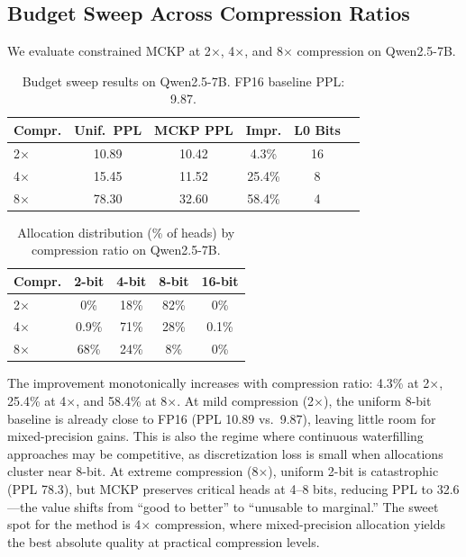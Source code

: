 \documentclass[11pt,a4paper]{article}
\begin{document}
\subsection{Budget Sweep Across Compression Ratios}
\label{sec:budget}

We evaluate constrained MCKP at 2$\times$, 4$\times$, and 8$\times$ compression on Qwen2.5-7B.

\begin{table}[t]
\centering
\small
\caption{Budget sweep results on Qwen2.5-7B. FP16 baseline PPL: 9.87.}
\label{tab:budget}
\begin{tabular}{lccccl}
\toprule
\textbf{Compr.} & \textbf{Unif.\ PPL} & \textbf{MCKP PPL} & \textbf{Impr.} & \textbf{L0 Bits} \\
\midrule
2$\times$ & 10.89 & 10.42 &  4.3\% & 16 \\
4$\times$ & 15.45 & 11.52 & 25.4\% &  8 \\
8$\times$ & 78.30 & 32.60 & 58.4\% &  4 \\
\bottomrule
\end{tabular}
\end{table}

\begin{table}[t]
\centering
\small
\caption{Allocation distribution (\% of heads) by compression ratio on Qwen2.5-7B.}
\label{tab:alloc_dist}
\begin{tabular}{lcccc}
\toprule
\textbf{Compr.} & \textbf{2-bit} & \textbf{4-bit} & \textbf{8-bit} & \textbf{16-bit} \\
\midrule
2$\times$ &  0\% & 18\% & 82\% & 0\% \\
4$\times$ &  0.9\% & 71\% & 28\% & 0.1\% \\
8$\times$ & 68\% & 24\% &  8\% & 0\% \\
\bottomrule
\end{tabular}
\end{table}

The improvement monotonically increases with compression ratio: 4.3\% at 2$\times$, 25.4\% at 4$\times$, and 58.4\% at 8$\times$.
At mild compression (2$\times$), the uniform 8-bit baseline is already close to FP16 (PPL 10.89 vs.\ 9.87), leaving little room for mixed-precision gains.
This is also the regime where continuous waterfilling approaches may be competitive, as discretization loss is small when allocations cluster near 8-bit.
At extreme compression (8$\times$), uniform 2-bit is catastrophic (PPL 78.3), but MCKP preserves critical heads at 4--8 bits, reducing PPL to 32.6---the value shifts from ``good to better'' to ``unusable to marginal.''
The sweet spot for the method is 4$\times$ compression, where mixed-precision allocation yields the best absolute quality at practical compression levels.
\end{document}
